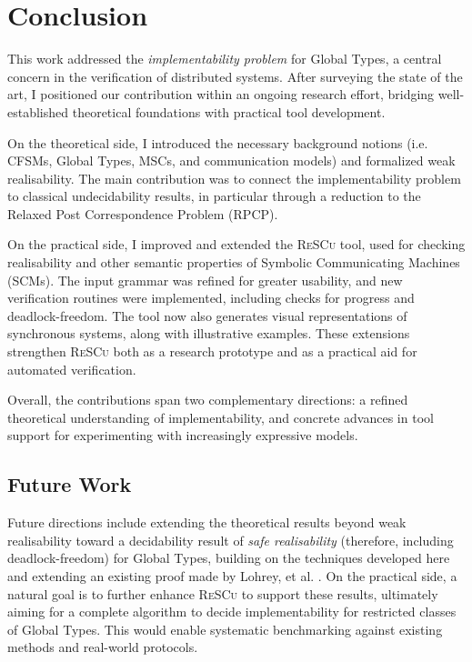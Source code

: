 \chapter{Conclusion}\label{sec:end}
This work addressed the \emph{implementability problem} for Global 
Types, a central concern in the verification of distributed systems. 
After surveying the state of the art, I positioned our contribution 
within an ongoing research effort, bridging well-established 
theoretical foundations with practical tool development.  

On the theoretical side, I introduced the necessary background 
notions (i.e. CFSMs, Global Types, MSCs, and communication models) and 
formalized weak realisability. The main contribution was to connect 
the implementability problem to classical undecidability results, in 
particular through a reduction to the Relaxed Post Correspondence 
Problem (RPCP).  

On the practical side, I improved and extended the 
\textsc{ReSCu} tool, used for checking realisability and other semantic 
properties of Symbolic Communicating Machines (SCMs). The input grammar 
was refined for greater usability, and new verification routines were 
implemented, including checks for progress and deadlock-freedom. The tool 
now also generates visual representations of synchronous systems, along 
with illustrative examples. These extensions strengthen 
\textsc{ReSCu} both as a research prototype and as a practical aid for 
automated verification.  

Overall, the contributions span two complementary directions: a refined 
theoretical understanding of implementability, and concrete advances in 
tool support for experimenting with increasingly expressive models. 

\section{Future Work}
Future directions include extending the theoretical results beyond weak 
realisability toward a decidability result of \emph{safe realisability} 
(therefore, including deadlock-freedom) for 
Global Types, building on the techniques developed here and extending
an existing proof made by Lohrey, et al. \cite{lohrey2003realizability}.
On the practical side, a natural goal is to further enhance \textsc{ReSCu} to  
support these results, ultimately aiming for a complete algorithm to decide 
implementability for restricted classes of Global Types. This would 
enable systematic benchmarking against existing methods and real-world 
protocols.